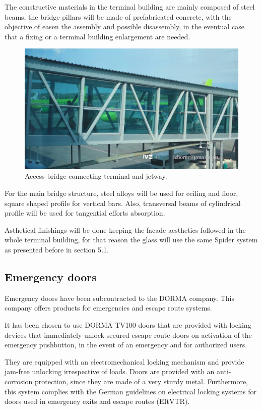 	The constructive materials in the terminal building are mainly composed of steel beams, the bridge pillars will be made of prefabricated concrete, with the objective of easen the assembly and possible disassembly, in the eventual case that a fixing or a terminal building enlargement are needed.
	
			\begin{figure}[ht!]
	\centering
\includegraphics[width=13cm]{./images/Facade/access}
\caption{Access bridge connecting terminal and jetway.}
\end{figure}
	
	For the main bridge structure, steel alloys will be used for ceiling and floor, square shaped profile for vertical bars. Also, transversal beams of cylindrical profile will be used for tangential efforts absorption. 
	
	Asthetical finishings will be done keeping the facade aesthetics followed in the whole terminal building, for that reason the glass will use the same Spider system as presented before in section 5.1.
	
		\subsection{Emergency doors}
	Emergency doors have been subcontracted to the DORMA company. This company offers products for emergencies and escape route systems. 
	
	It has been chosen to use DORMA TV100 doors that are provided with locking devices that immediately unlock secured escape route doors on activation of the emergency pushbutton, in the event of an emergency and for authorized users. 
	
	They are equipped with an electromechanical locking mechanism and provide jam-free unlocking irrespective of loads. Doors are provided with an anti-corrosion protection, since they are made of a very sturdy metal. Furthermore, this system complies with the German guidelines on electrical locking systems for doors used in emergency exits and escape routes (EItVTR).
	
